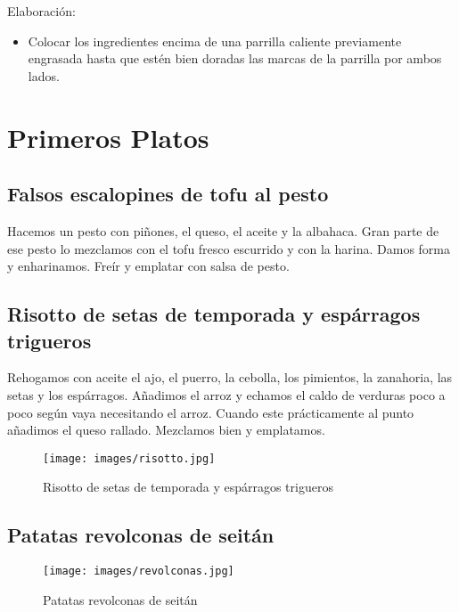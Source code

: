 Elaboración:
\begin{itemize}
\item Colocar los ingredientes encima de una parrilla caliente previamente engrasada hasta que estén bien doradas las marcas de la parrilla por ambos lados.
\end{itemize}

\section{Primeros Platos}
\label{sec:primeros}

\subsection{Falsos escalopines de tofu al pesto}
\label{sec:escalopines}

Hacemos un pesto con piñones, el queso, el aceite y la albahaca.
Gran parte de ese pesto lo mezclamos con el tofu fresco escurrido y con la harina. Damos forma y enharinamos. Freír y emplatar con salsa de pesto.

\subsection{Risotto de setas de temporada y espárragos trigueros}
\label{sec:risotto}

Rehogamos con aceite el ajo, el puerro, la cebolla, los pimientos, la zanahoria, las setas y los espárragos. Añadimos el arroz y echamos el caldo de verduras poco a poco según vaya necesitando el arroz. Cuando este prácticamente al punto añadimos el queso rallado. Mezclamos bien y emplatamos.

\begin{figure}[h]
  \begin{center}
    \texttt{[image: images/risotto.jpg]}
    \caption{Risotto de setas de temporada y espárragos trigueros}
    \label{fig:risotto}
  \end{center}
\end{figure}

\subsection{Patatas revolconas de seitán}
\label{sec:revolconas}

\begin{figure}[h]
  \begin{center}
    \texttt{[image: images/revolconas.jpg]}
    \caption{Patatas revolconas de seitán}
    \label{fig:revolconas}
  \end{center}
\end{figure}

